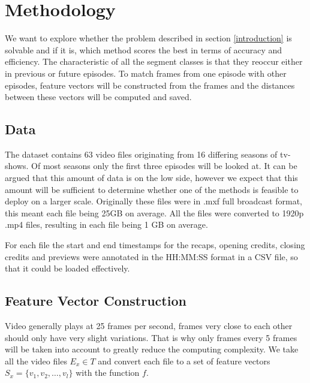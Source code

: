 \documentclass{article}
\begin{document}
\cite{gauch2006finding} %
\cite{wang2008multimodal} %

\cite{herley2006argos} %
\cite{berrani2008non} %

\cite{benezeth2010unsupervised} %
\cite{ibrahim2011tv} %
\cite{abduraman2011unsupervised} %
\fi


\section{Methodology} \label{methodology}
We want to explore whether the problem described in section \ref{introduction} is solvable and if it is, which method scores the best in terms of accuracy and efficiency. The characteristic of all the segment classes is that they reoccur either in previous or future episodes. To match frames from one episode with other episodes, feature vectors will be constructed from the frames and the distances between these vectors will be computed and saved.

\subsection{Data}
The dataset contains 63 video files originating from 16 differing seasons of tv-shows. Of most seasons only the first three episodes will be looked at. It can be argued that this amount of data is on the low side, however we expect that this amount will be sufficient to determine whether one of the methods is feasible to deploy on a larger scale. Originally these files were in .mxf full broadcast format, this meant each file being 25GB on average. All the files were converted to 1920p .mp4 files, resulting in each file being 1 GB on average.

For each file the start and end timestamps for the recaps, opening credits, closing credits and previews were annotated in the HH:MM:SS format in a CSV file, so that it could be loaded effectively.

\subsection{Feature Vector Construction}
Video generally plays at 25 frames per second, frames very close to each other should only have very slight variations. That is why only frames every 5 frames will be taken into account to greatly reduce the computing complexity. We take all the video files $E_x \in T$ and convert each file to a set of feature vectors $S_x = \{v_1, v_2, \dots, v_l\}$ with the function $f$.
\end{document}
